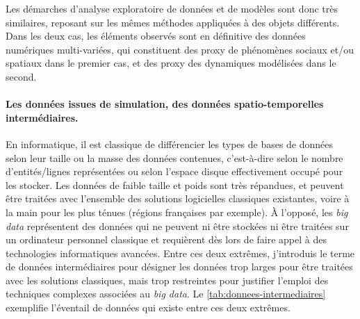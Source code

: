 Les démarches d'analyse exploratoire de données et de modèles sont donc très similaires, reposant sur les mêmes méthodes appliquées à des objets différents.
Dans les deux cas, les éléments observés sont en définitive des données numériques multi-variées, qui constituent des proxy de phénomènes sociaux et/ou spatiaux dans le premier cas, et des proxy des dynamiques modélisées dans le second.

\paragraph{Les données issues de simulation, des données spatio-temporelles \og intermédiaires\fg{}.}
En informatique, il est classique de différencier les types de bases de données selon leur \og taille\fg{} ou la masse des données contenues, c'est-à-dire selon le nombre d'entités/lignes représentées ou selon l'espace disque effectivement occupé pour les stocker.
Les données de faible taille et poids sont très répandues, et peuvent être traitées avec l'ensemble des solutions logicielles classiques existantes, voire à la main pour les plus ténues (régions françaises par exemple).
À l'opposé, les \og \textit{big data}\fg{} représentent des données qui ne peuvent ni être stockées ni être traitées sur un ordinateur personnel classique et requièrent dès lors de faire appel à des technologies informatiques avancées.
Entre ces deux extrêmes, j'introduis le terme de \og données intermédiaires\fg{} pour désigner les données trop larges pour être traitées avec les solutions classiques, mais trop restreintes pour justifier l'emploi des techniques complexes associées au \textit{big data}.
Le \cref{tab:donnees-intermediaires} exemplifie l'éventail de données qui existe entre ces deux extrêmes.

